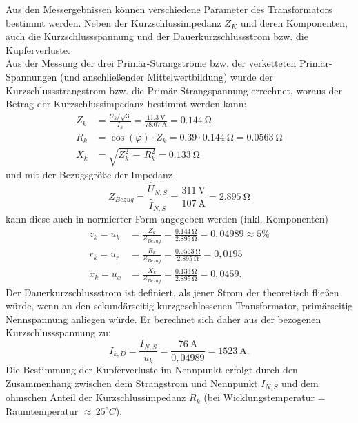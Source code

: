\noindent Aus den Messergebnissen können verschiedene Parameter des Transformators bestimmt werden. Neben der Kurzschlussimpedanz $Z_K$ und deren Komponenten, auch die Kurzschlussspannung und der Dauerkurzschlussstrom bzw. die Kupferverluste.\\
Aus der Messung der drei Primär-Strangströme bzw. der verketteten Primär-Spannungen (und anschließender Mittelwertbildung) wurde der Kurzschlussstrangstrom bzw. die Primär-Strangspannung errechnet, woraus der Betrag der Kurzschlussimpedanz bestimmt werden kann:
\begin{equation}
\begin{split}
    Z_k & = \frac{U_k/\sqrt{3}}{I_k} = \frac{\SI{11.3}{\volt}}{\SI{78.07}{\ampere}} = \SI{0.144}{\ohm}\\
    R_k & = \cos(\varphi)\cdot Z_k = 0.39\cdot \SI{0.144}{\ohm}=\SI{0.0563}{\ohm}\\
    X_k & = \sqrt{Z_k^2\,-\,R_k^2}=\SI{0.133}{\ohm}
\end{split}
\end{equation}
und mit der Bezugsgröße der Impedanz
\begin{equation}
    Z_{Bezug} = \frac{\hat{U}_{N,S}}{\hat{I}_{N,S}}=\frac{\SI{311}{\volt}}{\SI{107}{\ampere}}=\SI{2.895}{\ohm}
\end{equation}
kann diese auch in normierter Form angegeben werden (inkl. Komponenten)
\begin{equation}
\begin{split}
    z_k = u_k & = \frac{Z_k}{Z_{Bezug}}=\frac{\SI{0.144}{\ohm}}{\SI{2.895}{\ohm}}=0,04989\approx5\%\\
    r_k = u_r & = \frac{R_k}{Z_{Bezug}}=\frac{\SI{0.0563}{\ohm}}{\SI{2.895}{\ohm}}=0,0195\\
    x_k = u_x & = \frac{X_k}{Z_{Bezug}}=\frac{\SI{0.133}{\ohm}}{\SI{2.895}{\ohm}}=0,0459.
\end{split}
\end{equation}
Der Dauerkurzschlussstrom ist definiert, als jener Strom der theoretisch fließen würde, wenn an den sekundärseitig kurzgeschlossenen Transformator, primärseitig Nennspannung anliegen würde. Er berechnet sich daher aus der bezogenen Kurzschlussspannung zu:
\begin{equation}
    I_{k,D}=\frac{I_{N,S}}{u_k}=\frac{\SI{76}{\ampere}}{0,04989}=\SI{1523}{\ampere}.
\end{equation}
Die Bestimmung der Kupferverluste im Nennpunkt erfolgt durch den Zusammenhang zwischen dem Strangstrom und Nennpunkt $I_{N,S}$ und dem ohmschen Anteil der Kurzschlussimpedanz $R_k$ (bei Wicklungstemperatur = Raumtemperatur $\approx\,25^{\circ}C$):
